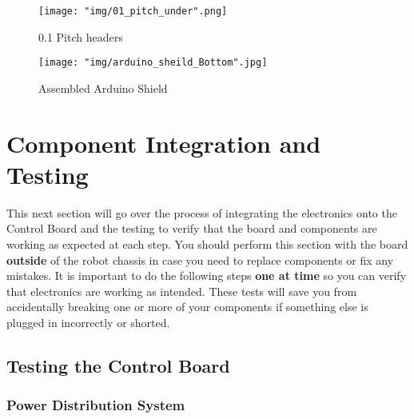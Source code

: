 \documentclass{article}
\begin{document}
\begin{enumerate}
\begin{figure}[H]
	\centering
	\texttt{[image: "img/01\_pitch\_under".png]}
	\caption{0.1 Pitch headers}
\end{figure}

\begin{figure}[H]
  \centering
  \begin{minipage}[b]{0.75\textwidth}
    \texttt{[image: "img/arduino\_sheild\_Bottom".jpg]}
  \end{minipage}
  \caption{Assembled Arduino Shield}
  \label{assembled_arduino_shield_bottom}
\end{figure}

\end{enumerate}

\section{Component Integration and Testing}

This next section will go over the process of integrating the electronics onto the Control Board and the testing to verify that the board and components are working as expected at each step. You should perform this section with the board \textbf{outside} of the robot chassis in case you need to replace components or fix any mistakes. It is important to do the following steps \textbf{one at time} so you can verify that electronics are working as intended. These tests will save you from accidentally breaking one or more of your components if something else is plugged in incorrectly or shorted.

\subsection{Testing the Control Board}
\subsubsection{Power Distribution System}
\end{document}
